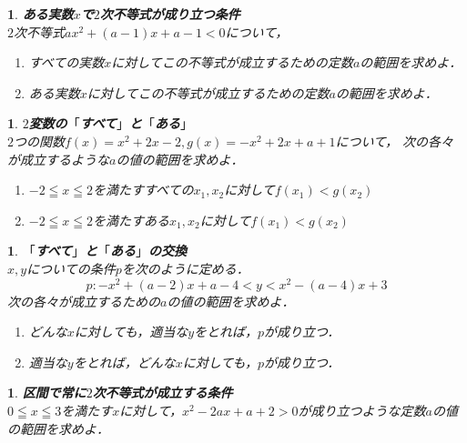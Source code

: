 \documentclass[10pt,
fleqn,
dvipdfmx,
uplatex
]{jsarticle}
\newtheorem{question}[Question]{}
\begin{document}
\begin{question}{\bf\boldmath ある実数$x$で$2$次不等式が成り立つ条件}\\
$2$次不等式$ax^2+\left(a-1\right)x+a-1<0$について，
\begin{enumerate}
\item すべての実数$x$に対してこの不等式が成立するための定数$a$の範囲を求めよ．
\item ある実数$x$に対してこの不等式が成立するための定数$a$の範囲を求めよ．
\end{enumerate}

\end{question}



\begin{question}{\bf\boldmath $2$変数の$「$すべて$」$と$「$ある$」$}\\
$2$つの関数$f\left(x\right)=x^2+2x-2, g\left(x\right)=-x^2+2x+a+1$について，
次の各々が成立するような$a$の値の範囲を求めよ．
\begin{enumerate}
\item $-2\leqq x\leqq 2$を満たすすべての$x_1,x_2$に対して$f\left(x_1\right)<g\left(x_2\right)$
\item $-2\leqq x\leqq 2$を満たすある$x_1,x_2$に対して$f\left(x_1\right)<g\left(x_2\right)$
\end{enumerate}

\end{question}



\begin{question}{\bf\boldmath $「$すべて$」$と$「$ある$」$の交換}\\
$x, y$についての条件$p$を次のように定める．
\[p:-x^2+\left(a-2\right)x+a-4<y<x^2-\left(a-4\right)x+3\]
次の各々が成立するための$a$の値の範囲を求めよ．
\begin{enumerate}
\item どんな$x$に対しても，適当な$y$をとれば，$p$が成り立つ．
\item 適当な$y$をとれば，どんな$x$に対しても，$p$が成り立つ．
\end{enumerate}

\end{question}



\begin{question}{\bf\boldmath 区間で常に$2$次不等式が成立する条件}\\
$0\leqq x\leqq 3$を満たす$x$に対して，$x^2-2ax+a+2>0$が成り立つような定数$a$の値の範囲を求めよ．
\end{question}
\end{document}
